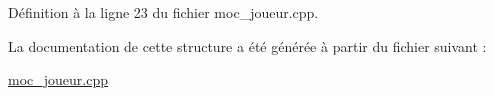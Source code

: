 Définition à la ligne 23 du fichier moc\-\_\-joueur.\-cpp.



La documentation de cette structure a été générée à partir du fichier suivant \-:\begin{DoxyCompactItemize}
\item 
\hyperlink{moc__joueur_8cpp}{moc\-\_\-joueur.\-cpp}\end{DoxyCompactItemize}

